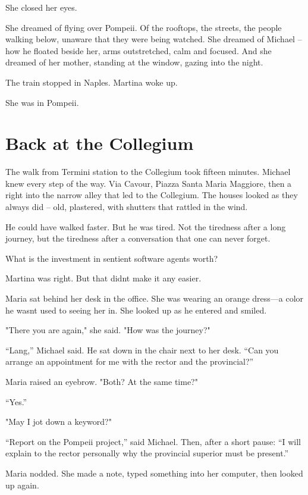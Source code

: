 \documentclass[
]{article}
\begin{document}
She closed her eyes.

She dreamed of flying over Pompeii. Of the rooftops, the streets, the people walking below, unaware that they were being watched. She dreamed of Michael -- how he floated beside her, arms outstretched, calm and focused. And she dreamed of her mother, standing at the window, gazing into the night.

The train stopped in Naples. Martina woke up.

She was in Pompeii.

\section{Back at the Collegium}\label{back-at-the-collegium}

The walk from Termini station to the Collegium took fifteen minutes. Michael knew every step of the way. Via Cavour, Piazza Santa Maria Maggiore, then a right into the narrow alley that led to the Collegium. The houses looked as they always did -- old, plastered, with shutters that rattled in the wind.

He could have walked faster. But he was tired. Not the tiredness after a long journey, but the tiredness after a conversation that one can never forget.

What is the investment in sentient software agents worth?

Martina was right. But that didn\textquotesingle t make it any easier.

Maria sat behind her desk in the office. She was wearing an orange dress---a color he wasn\textquotesingle t used to seeing her in. She looked up as he entered and smiled.

"There you are again," she said. "How was the journey?"

``Lang,'' Michael said. He sat down in the chair next to her desk. ``Can you arrange an appointment for me with the rector and the provincial?''

Maria raised an eyebrow. "Both? At the same time?"

``Yes.''

"May I jot down a keyword?"

``Report on the Pompeii project,'' said Michael. Then, after a short pause: ``I will explain to the rector personally why the provincial superior must be present.''

Maria nodded. She made a note, typed something into her computer, then looked up again.
\end{document}
